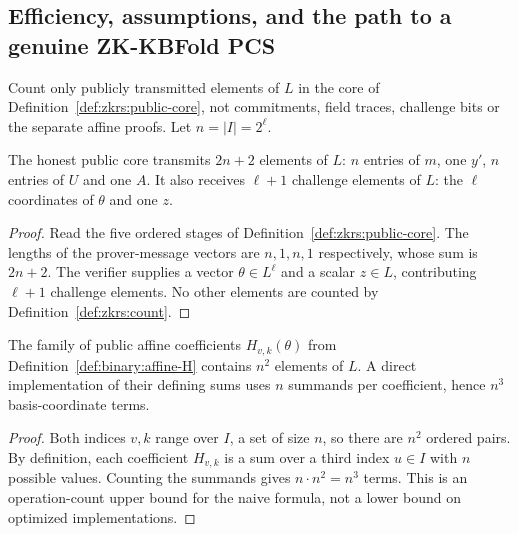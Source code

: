 \subsection{Efficiency, assumptions, and the path to a genuine ZK-KBFold PCS}\label{sec:zkrs:ledger}

\begin{definition}\label{def:zkrs:count}
Count only publicly transmitted elements of $L$
in the core of Definition~\ref{def:zkrs:public-core},
not commitments, field traces, challenge bits or
the separate affine proofs. Let $n=|I|=2^\ell$.
\end{definition}

\begin{lemma}\label{lem:zkrs:count}
The honest public core transmits $2n+2$ elements of $L$:
$n$ entries of $m$, one $y'$, $n$ entries of $U$ and one $A$.
It also receives $\ell+1$ challenge elements of $L$:
the $\ell$ coordinates of $\theta$ and one $z$.
\end{lemma}
\begin{proof}
Read the five ordered stages of
Definition~\ref{def:zkrs:public-core}.
The lengths of the prover-message
vectors are $n,1,n,1$ respectively,
whose sum is $2n+2$.
The verifier supplies a vector
$\theta\in L^\ell$ and
a scalar $z\in L$, contributing
$\ell+1$ challenge elements.
No other elements are counted by
Definition~\ref{def:zkrs:count}.
\end{proof}

\begin{lemma}\label{lem:zkrs:H-count}
The family of public affine coefficients
$H_{v,k}(\theta)$ from
Definition~\ref{def:binary:affine-H}
contains $n^2$ elements of $L$.
A direct implementation of their
defining sums uses $n$ summands
per coefficient, hence $n^3$
basis-coordinate terms.
\end{lemma}
\begin{proof}
Both indices $v,k$ range over
$I$, a set of size $n$, so
there are $n^2$ ordered pairs.
By definition, each coefficient
$H_{v,k}$ is a sum over a third
index $u\in I$ with $n$ possible
values. Counting the summands
gives $n\cdot n^2=n^3$ terms.
This is an operation-count upper
bound for the naive formula,
not a lower bound on optimized
implementations.
\end{proof}

